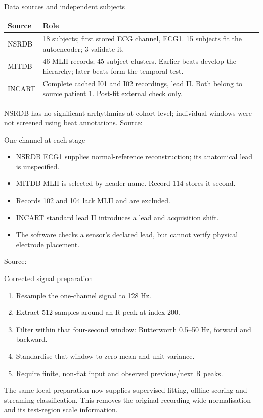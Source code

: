 \documentclass[aspectratio=169,11pt]{beamer}
\newcommand{\source}[1]{\vfill{\tiny\color{gray!80}Source: \cite{#1}}}
\begin{document}
\begin{frame}{Data sources and independent subjects}
\small
\begin{tabular}{lp{}}
\toprule
Source & Role\\
\midrule
NSRDB & 18 subjects; first stored ECG channel, ECG1.
15 subjects fit the autoencoder; 3 validate it.\\
MITDB & 46 MLII records; 45 subject clusters.
Earlier beats develop the hierarchy; later beats form the temporal test.\\
INCART & Complete cached I01 and I02 recordings, lead II.
Both belong to source patient 1. Post-fit external check only.\\
\bottomrule
\end{tabular}
\medskip
NSRDB has no significant arrhythmias at cohort level; individual windows
were not screened using beat annotations.
\source{nsrdb,mitdb,incartdb}
\end{frame}

\begin{frame}{One channel at each stage}
\begin{itemize}
\item NSRDB ECG1 supplies normal-reference reconstruction; its anatomical
lead is unspecified.
\item MITDB MLII is selected by header name. Record 114 stores it second.
\item Records 102 and 104 lack MLII and are excluded.
\item INCART standard lead II introduces a lead and acquisition shift.
\item The software checks a sensor's declared lead, but cannot verify
physical electrode placement.
\end{itemize}
\source{nsrdb,mitdb,incartdb}
\end{frame}

\begin{frame}{Corrected signal preparation}
\begin{enumerate}
\item Resample the one-channel signal to 128 Hz.
\item Extract 512 samples around an R peak at index 200.
\item Filter within that four-second window: Butterworth 0.5--50 Hz,
forward and backward.
\item Standardise that window to zero mean and unit variance.
\item Require finite, non-flat input and observed previous/next R peaks.
\end{enumerate}
\medskip
The same local preparation now supplies supervised fitting, offline scoring
and streaming classification. This removes the original recording-wide
normalisation and its test-region scale information.
\end{frame}
\end{document}
